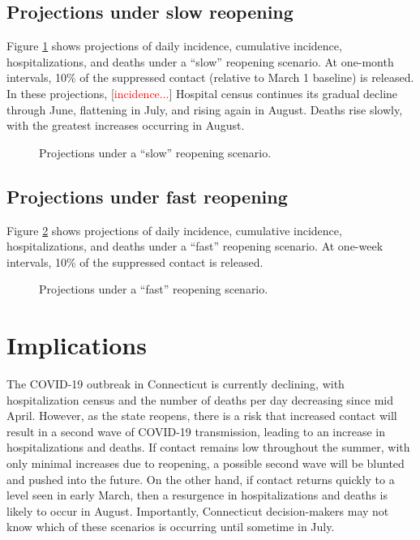 \documentclass[11pt]{article}
\newcommand{\comment}[1]{[\textcolor{red}{#1}]}
\begin{document}
\subsection*{Projections under slow reopening} 

Figure \ref{fig:slow} shows projections of daily incidence, cumulative incidence, hospitalizations, and deaths under a ``slow'' reopening scenario. At one-month intervals, 10\% of the suppressed contact (relative to March 1 baseline) is released. In these projections, \comment{incidence...} Hospital census continues its gradual decline through June, flattening in July, and rising again in August. Deaths rise slowly, with the greatest increases occurring in August. 


\begin{figure}
\centering
\comment{slow reopen placeholder}
\caption{Projections under a ``slow'' reopening scenario. }
\label{fig:slow}
\end{figure}



\subsection*{Projections under fast reopening} 

Figure \ref{fig:fast} shows projections of daily incidence, cumulative incidence, hospitalizations, and deaths under a ``fast'' reopening scenario. At one-week intervals, 10\% of the suppressed contact is released.   

\begin{figure}
\centering
\comment{fast reopen placeholder}
\caption{Projections under a ``fast'' reopening scenario. }
\label{fig:fast}
\end{figure}






\section*{Implications}

The COVID-19 outbreak in Connecticut is currently declining, with hospitalization census and the number of deaths per day decreasing since mid April.  However, as the state reopens, there is a risk that increased contact will result in a second wave of COVID-19 transmission, leading to an increase in hospitalizations and deaths.  If contact remains low throughout the summer, with only minimal increases due to reopening, a possible second wave will be blunted and pushed into the future.  On the other hand, if contact returns quickly to a level seen in early March, then a resurgence in hospitalizations and deaths is likely to occur in August.  Importantly, Connecticut decision-makers may not know which of these scenarios is occurring until sometime in July.  
\end{document}
